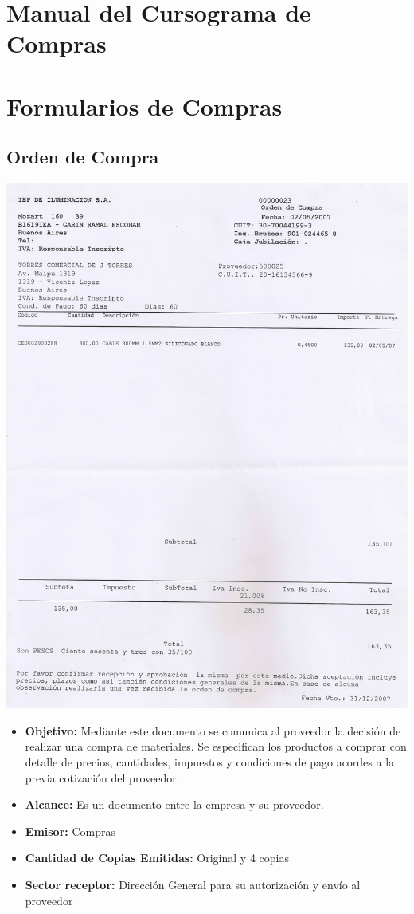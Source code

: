 \pagebreak
\section{Manual del Cursograma de Compras}

\pagebreak
\section{Formularios de Compras}
\subsection{Orden de Compra}
\begin{center}
 \includegraphics[scale=1.6,keepaspectratio=true]{./Images/FormulariosIEP/Orden-de-Compra.png}
\end{center}
\begin{itemize}
  \item \textbf{Objetivo:} Mediante este documento se comunica al proveedor la decisión de realizar una compra de materiales. Se especifican los productos a comprar con detalle de precios, cantidades, impuestos y condiciones de pago acordes a la previa cotización del proveedor.
  \item \textbf{Alcance:} Es un documento entre la empresa y su proveedor.
  \item \textbf{Emisor:} Compras
  \item \textbf{Cantidad de Copias Emitidas:} Original y 4 copias
  \item \textbf{Sector receptor:} Dirección General para su autorización y envío al proveedor
 \end{itemize}
